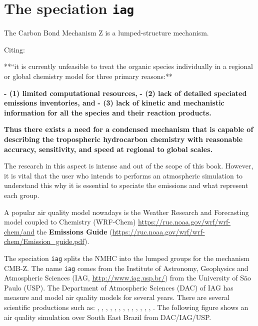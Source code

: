 \documentclass[12pt,graybox,envcountchap,sectrefs]{krantz}
\theoremstyle{definition}
\theoremstyle{definition}
\theoremstyle{definition}
\theoremstyle{remark}
\begin{document}
\section{\texorpdfstring{The speciation
\texttt{iag}}{The speciation iag}}\label{the-speciation-iag}

The Carbon Bond Mechanism Z \citeyearpar{cbmz} is a lumped-structure
mechanism.

Citing:

**``it is currently unfeasible to treat the organic species individually
in a regional or global chemistry model for three primary reasons:**

\textbf{- (1) limited computational resources,} \textbf{- (2) lack of
detailed speciated emissions inventories, and } \textbf{- (3) lack of
kinetic and mechanistic information for all the species and their
reaction products.}

\textbf{Thus there exists a need for a condensed mechanism that is
capable of describing the tropospheric hydrocarbon chemistry with
reasonable accuracy, sensitivity, and speed at regional to global
scales. }

The research in this aspect is intense and out of the scope of this
book. However, it is vital that the user who intends to performs an
atmospheric simulation to understand this why it is essential to
speciate the emissions and what represent each group.

A popular air quality model nowadays is the Weather Research and
Forecasting model coupled to Chemistry (WRF-Chem) \citep{Grelletal2005}
\url{https://ruc.noaa.gov/wrf/wrf-chem/and} the \textbf{Emissions Guide}
(\url{https://ruc.noaa.gov/wrf/wrf-chem/Emission_guide.pdf}).

The speciation \texttt{iag} splits the NMHC into the lumped groups for
the mechanism CMB-Z. The name \texttt{iag} comes from the Institute of
Astronomy, Geophysics and Atmospheric Sciences (IAG,
\url{http://www.iag.usp.br/}) from the University of São Paulo (USP).
The Department of Atmospheric Sciences (DAC) of IAG has measure and
model air quality models for several years. There are several scientific
productions such as: \citet{Nogueiraetal2015},
\citet{HOSHYARIPOUR2016365}, \citet{Andradeetal2017},
\citet{Freitasetal2005}, \citet{martins2006emission},
\citet{perez2014emission}, \citet{ulke2001modeling},
\citet{vivanco2006validation}, \citet{boian2012characterization},
\citet{Andrade2012}, \citet{Andradeetal2015}, \citet{VaraVelaetal2015},
\citet{Rafee2015}, \citet{Ibarraetal2017b}. The following figure shows
an air quality simulation over South East Brazil from DAC/IAG/USP.
\end{document}
